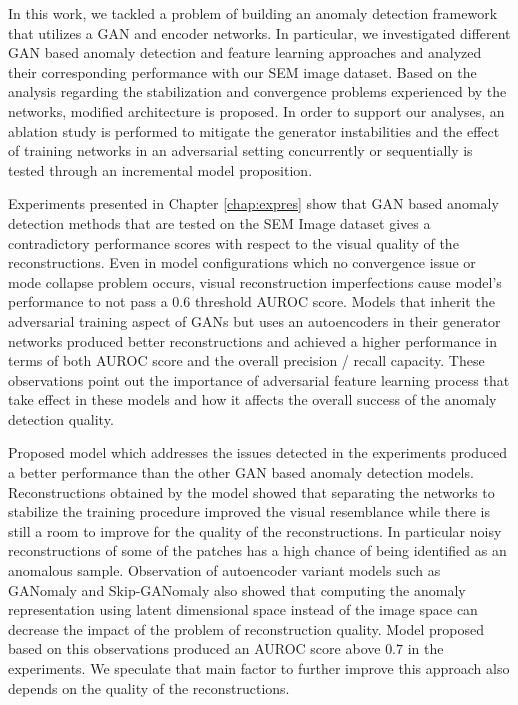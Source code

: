 
\begingroup

	
In this work, we tackled a problem of building an anomaly detection framework that utilizes a 
GAN and encoder networks. In particular, we investigated different 
GAN based anomaly detection and feature learning approaches and analyzed their corresponding 
performance with our SEM image dataset. Based on the analysis regarding the stabilization and 
convergence problems experienced by the networks, modified architecture is proposed. In order to support 
our analyses, an ablation study is performed to mitigate the generator instabilities and the 
effect of training networks in an adversarial setting concurrently or sequentially is tested through 
an incremental model proposition.

Experiments presented in Chapter \ref{chap:expres} show that GAN based anomaly detection methods that 
are tested on the SEM Image dataset gives a contradictory performance scores with respect to the visual 
quality of the reconstructions. Even in model configurations which no convergence issue or mode collapse problem 
occurs, visual reconstruction imperfections cause model's performance to not pass a $0.6$ threshold AUROC score.
Models that inherit the adversarial training aspect of GANs but uses an autoencoders in 
their generator networks produced better reconstructions and achieved a higher performance in terms 
of both AUROC score and the overall precision / recall capacity. These observations point out the importance 
of adversarial feature learning process that take effect in these models and how it affects the overall success 
of the anomaly detection quality.

Proposed model which addresses the issues detected in the experiments produced a better performance 
than the other GAN based anomaly detection models. Reconstructions obtained by the model showed that 
separating the networks to stabilize the training procedure improved the visual resemblance while there 
is still a room to improve for the quality of the reconstructions. In particular noisy reconstructions of 
some of the patches has a high chance of being identified as an anomalous sample. Observation of autoencoder 
variant models such as GANomaly and Skip-GANomaly also showed that computing the anomaly representation using 
latent dimensional space instead of the image space can decrease the impact of the problem of reconstruction quality. 
Model proposed based on this observations produced an AUROC score above $0.7$ in the experiments. We speculate 
that main factor to further improve this approach also depends on the quality of the reconstructions.

